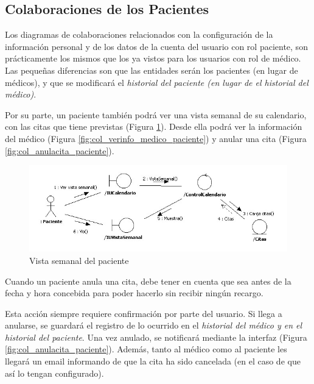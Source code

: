 \documentclass[a4paper,oneside,11pt]{book}
\begin{document}
		
		\newpage
		\subsection{Colaboraciones de los Pacientes} %
		\label{sub:colaboraciones_de_los_pacientes}
					
			Los diagramas de colaboraciones relacionados con la configuración de la información personal y de los datos de la cuenta del usuario con rol paciente, son prácticamente los mismos que los ya vistos para los usuarios con rol de médico. Las pequeñas diferencias son que las entidades serán los pacientes (en lugar de médicos), y que se modificará el \textit{historial del paciente (en lugar de el historial del médico)}.
			
			Por su parte, un paciente también podrá ver una vista semanal de su calendario, con las citas que tiene previstas (Figura \ref{fig:col_vistasemanal_paciente}). Desde ella podrá ver la información del médico (Figura \ref{fig:col_verinfo_medico_paciente}) y anular una cita (Figura \ref{fig:col_anulacita_paciente}).
			
			\bigskip
			\bigskip
			\begin{figure}[H]
			  \centering
			    \includegraphics[width=16cm]{img/jpg/colaboraciones/25_VistaSemanalPaciente.jpg}
			  \caption{Vista semanal del paciente}
			  \label{fig:col_vistasemanal_paciente}
			\end{figure}
			
			\bigskip
			\bigskip
			
			Cuando un paciente anula una cita, debe tener en cuenta que sea antes de la fecha y hora concebida para poder hacerlo sin recibir ningún recargo. 
			
			Esta acción siempre requiere confirmación por parte del usuario. Si llega a anularse, se guardará el registro de lo ocurrido en el \textit{historial del médico y en el historial del paciente}. Una vez anulado, se notificará mediante la interfaz (Figura \ref{fig:col_anulacita_paciente}). Además, tanto al médico como al paciente les llegará un email informando de que la cita ha sido cancelada (en el caso de que así lo tengan configurado).
			
\end{document}
